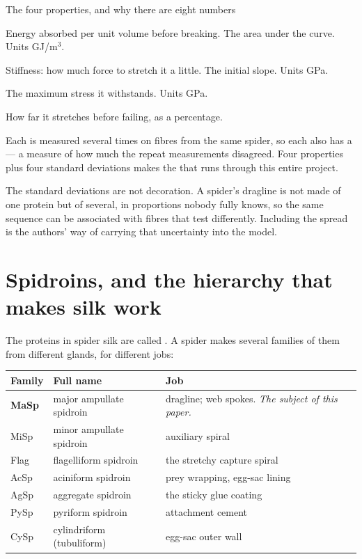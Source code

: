\begin{keybox}{The four properties, and why there are eight numbers}
\begin{description}[leftmargin=2.6cm,style=nextline,itemsep=2pt]
  \item[Toughness] Energy absorbed per unit volume before breaking. The area
        under the curve. Units GJ/m$^3$.
  \item[Elastic modulus $E$] Stiffness: how much force to stretch it a little.
        The initial slope. Units GPa.
  \item[Tensile strength] The maximum stress it withstands. Units GPa.
  \item[Strain at break] How far it stretches before failing, as a percentage.
\end{description}
Each is measured several times on fibres from the same spider, so each also has
a  --- a measure of how much the repeat measurements
disagreed. Four properties plus four standard deviations makes the
 that runs through this entire project.
\end{keybox}

The standard deviations are not decoration. A spider's dragline is not made of
one protein but of several, in proportions nobody fully knows, so the same
sequence can be associated with fibres that test differently. Including the
spread is the authors' way of carrying that uncertainty into the model.

\section{Spidroins, and the hierarchy that makes silk work}

The proteins in spider silk are called . A spider makes several
families of them from different glands, for different jobs:

\begin{center}
\small
\begin{tabular}{lll}
\toprule
\textbf{Family} & \textbf{Full name} & \textbf{Job} \\
\midrule
\textbf{MaSp} & major ampullate spidroin & dragline; web spokes. \emph{The subject of this paper.} \\
MiSp & minor ampullate spidroin & auxiliary spiral \\
Flag & flagelliform spidroin & the stretchy capture spiral \\
AcSp & aciniform spidroin & prey wrapping, egg-sac lining \\
AgSp & aggregate spidroin & the sticky glue coating \\
PySp & pyriform spidroin & attachment cement \\
CySp & cylindriform (tubuliform) & egg-sac outer wall \\
\bottomrule
\end{tabular}
\end{center}

